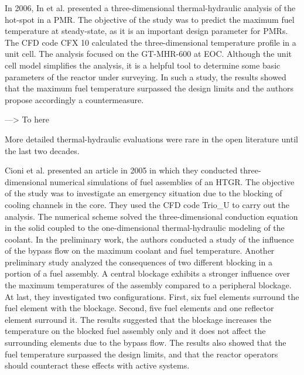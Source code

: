 \documentclass[11pt,letterpaper]{article}
\begin{document}
In 2006, In et al. \cite{in_three-dimensional_2006} presented a three-dimensional thermal-hydraulic analysis of the hot-spot in a \gls{PMR}.
The objective of the study was to predict the maximum fuel temperature at steady-state, as it is an important design parameter for \glspl{PMR}.
The CFD code CFX 10 \cite{ansys_inc_cfx_2006} calculated the three-dimensional temperature profile in a unit cell.
The analysis focused on the GT-MHR-600 at \gls{EOC}.
Although the unit cell model simplifies the analysis, it is a helpful tool to determine some basic parameters of the reactor under surveying.
In such a study, the results showed that the maximum fuel temperature surpassed the design limits and the authors propose accordingly a countermeasure.




---> To here





More detailed thermal-hydraulic evaluations were rare in the open literature until the last two decades.

Cioni et al. \cite{cioni_3d_2006} presented an article in 2005 in which they conducted three-dimensional numerical simulations of fuel assemblies of an \gls{HTGR}.
The objective of the study was to investigate an emergency situation due to the blocking of cooling channels in the core.
They used the \gls{CFD} code Trio_U \cite{bieder_priceles_2000} to carry out the analysis.
The numerical scheme solved the three-dimensional conduction equation in the solid coupled to the one-dimensional thermal-hydraulic modeling of the coolant.
In the preliminary work, the authors conducted a study of the influence of the bypass flow on the maximum coolant and fuel temperature.
Another preliminary study analyzed the consequences of two different blocking in a portion of a fuel assembly.
A central blockage exhibits a stronger influence over the maximum temperatures of the assembly compared to a peripheral blockage.
At last, they investigated two configurations.
First, six fuel elements surround the fuel element with the blockage.
Second, five fuel elements and one reflector element surround it.
The results suggested that the blockage increases the temperature on the blocked fuel assembly only and it does not affect the surrounding elements due to the bypass flow.
The results also showed that the fuel temperature surpassed the design limits, and that the reactor operators should counteract these effects with active systems.
\end{document}
